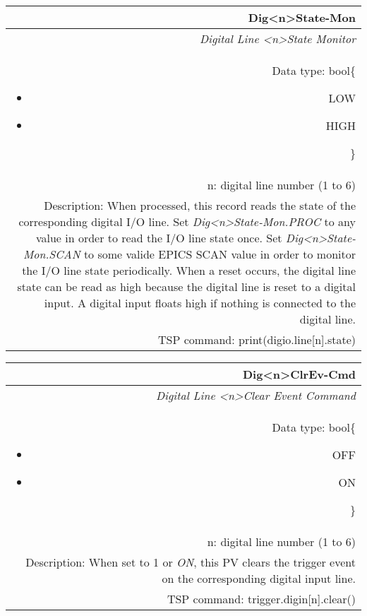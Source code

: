 \documentclass[openany]{article}
\begin{document}
		\begin{tabular}{N}
			\hline
			\bfseries Dig{\textless n\textgreater}State-Mon\label{pv:digstate-mon} \\ \hline
			\emph{Digital Line \textless n\textgreater State Monitor} \\
			Data type: bool\{\begin{itemize}[noitemsep]
				\small
				\item[] LOW
				\item[] HIGH
			\end{itemize}\} \\
			n: digital line number (1 to 6) \\
			Description: When processed, this record reads the state of the corresponding digital I/O line. Set \emph{Dig{\textless n\textgreater}State-Mon.PROC} to any value in order to read the I/O line state once. Set \emph{Dig{\textless n\textgreater}State-Mon.SCAN} to some valide EPICS SCAN value in order to monitor the I/O line state periodically. When a reset occurs, the digital line state can be read as high because the digital line is reset to a digital input. A digital input floats high if nothing is connected to the digital line. \\
			TSP command: print(digio.line[n].state)
		\end{tabular}

		\begin{tabular}{N}
			\hline
			\bfseries Dig{\textless n\textgreater}ClrEv-Cmd\label{pv:digclrev-cmd} \\ \hline
			\emph{Digital Line \textless n\textgreater Clear Event Command} \\
			Data type: bool\{\begin{itemize}[noitemsep]
				\small
				\item[] OFF
				\item[] ON
			\end{itemize}\} \\
			n: digital line number (1 to 6) \\
			Description: When set to 1 or \emph{ON}, this PV clears the trigger event on the corresponding digital input line. \\
			TSP command: trigger.digin[n].clear()
		\end{tabular}
\end{document}
